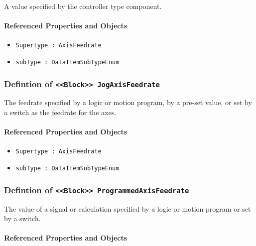 A value specified by the controller type component.

\FloatBarrier
\paragraph{Referenced Properties and Objects}

\begin{itemize}
\item \texttt{Supertype : AxisFeedrate}

\item \texttt{subType : DataItemSubTypeEnum}

\end{itemize}
\FloatBarrier
\subsubsection{Defintion of \texttt{<<Block>> JogAxisFeedrate}}
  \label{type:JogAxisFeedrate}

\FloatBarrier

The feedrate specified by a logic or motion program, by a pre-set value, or set by a switch as the feedrate for the axes. 

\FloatBarrier
\paragraph{Referenced Properties and Objects}

\begin{itemize}
\item \texttt{Supertype : AxisFeedrate}

\item \texttt{subType : DataItemSubTypeEnum}

\end{itemize}
\FloatBarrier
\subsubsection{Defintion of \texttt{<<Block>> ProgrammedAxisFeedrate}}
  \label{type:ProgrammedAxisFeedrate}

\FloatBarrier

The value of a signal or calculation specified by a logic or motion program or set by a switch.

\FloatBarrier
\paragraph{Referenced Properties and Objects}

